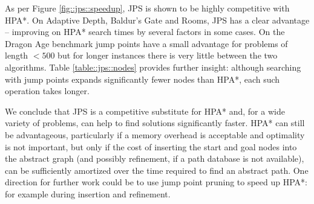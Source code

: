 As per Figure \ref{fig::jps::speedup}, JPS is shown to be highly competitive
with HPA*.  On Adaptive Depth, Baldur's Gate and Rooms, JPS has a clear
advantage -- improving on HPA* search times by several factors in some cases.
On the Dragon Age benchmark jump points have a small advantage for problems of
length $< 500$ but for longer instances there is very little between the two
algorithms.  Table \ref{table::jps::nodes} provides further insight: although
searching with jump points expands significantly fewer nodes than HPA*, each
such operation takes longer.

We conclude that JPS is a competitive substitute for HPA* and, for a wide
variety of problems, can help to find solutions significantly faster.  HPA*
can still be advantageous, particularly if a memory overhead is acceptable and
optimality is not important, but only if the cost of inserting the start and
goal nodes into the abstract graph (and possibly refinement, if a path
database is not available), can be sufficiently amortized over the time
required to find an abstract path.  One direction for further work could be to
use jump point pruning to speed up HPA*: for example during insertion and
refinement.

